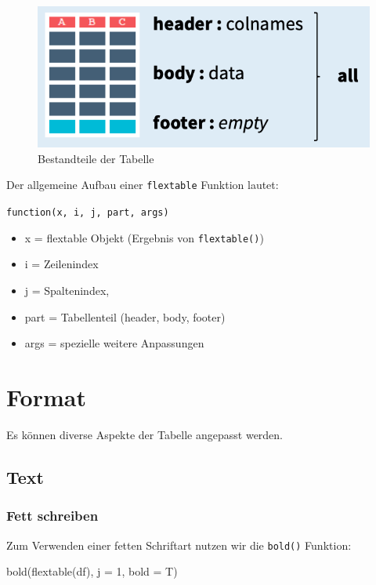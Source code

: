 \documentclass[
]{book}
\newenvironment{Shaded}{\begin{snugshade}}{\end{snugshade}}
\newcommand{\AttributeTok}[1]{\textcolor[rgb]{0.77,0.63,0.00}{#1}}
\newcommand{\DecValTok}[1]{\textcolor[rgb]{0.00,0.00,0.81}{#1}}
\newcommand{\FunctionTok}[1]{\textcolor[rgb]{0.00,0.00,0.00}{#1}}
\newcommand{\NormalTok}[1]{#1}
\providecommand{\tightlist}{%
  \setlength{\itemsep}{0pt}\setlength{\parskip}{0pt}}
\begin{document}
\begin{figure}
\includegraphics[width=8.72in]{images/flextab2} \caption{Bestandteile der Tabelle}\label{fig:unnamed-chunk-193}
\end{figure}

Der allgemeine Aufbau einer \texttt{flextable} Funktion lautet:

\texttt{function(x,\ i,\ j,\ part,\ args)}

\begin{itemize}
\tightlist
\item
  x = flextable Objekt (Ergebnis von \texttt{flextable()})
\item
  i = Zeilenindex
\item
  j = Spaltenindex,
\item
  part = Tabellenteil (header, body, footer)
\item
  args = spezielle weitere Anpassungen
\end{itemize}

\hypertarget{format}{%
\section{Format}\label{format}}

Es können diverse Aspekte der Tabelle angepasst werden.

\hypertarget{text}{%
\subsection{Text}\label{text}}

\hypertarget{fett-schreiben}{%
\subsubsection{Fett schreiben}\label{fett-schreiben}}

Zum Verwenden einer fetten Schriftart nutzen wir die \texttt{bold()} Funktion:

\begin{Shaded}
\begin{Highlighting}[]
\FunctionTok{bold}\NormalTok{(}\FunctionTok{flextable}\NormalTok{(df), }\AttributeTok{j =} \DecValTok{1}\NormalTok{, }\AttributeTok{bold =}\NormalTok{ T)}
\end{Highlighting}
\end{Shaded}
\end{document}
